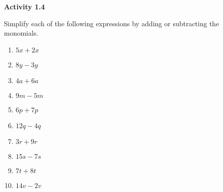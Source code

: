
\noindent\textbf{Activity 1.4}



Simplify each of the following expressions by adding or subtracting the monomials.

\begin{enumerate}
    \item \( 5x + 2x \)
    \item \( 8y - 3y \)
    \item \( 4a + 6a \)
    \item \( 9m - 5m \)
    \item \( 6p + 7p \)
    \item \( 12q - 4q \)
    \item \( 3r + 9r \)
    \item \( 15s - 7s \)
    \item \( 7t + 8t \)
    \item \( 14v - 2v \)
\end{enumerate}
